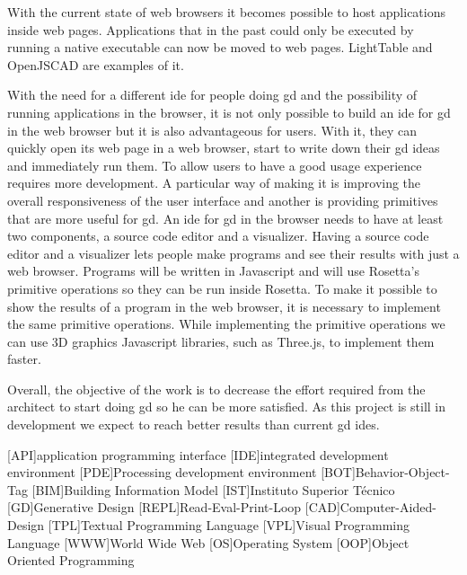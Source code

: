 \documentclass{./llncs2e/llncs}
\begin{document}
	With the current state of web browsers it becomes possible to host applications inside web pages. 
	Applications that in the past could only be executed by running a native executable can now be moved to web pages.
	LightTable and OpenJSCAD are examples of it.
	
	With the need for a different \ac{ide} for people doing \ac{gd} and the possibility of running applications in the browser, it is not only possible to build an \ac{ide} for \ac{gd} in the web browser but it is also advantageous for users.
	With it, they can quickly open its web page in a web browser, start to write down their \ac{gd} ideas and immediately run them.
	To allow users to have a good usage experience requires more development.
	A particular way of making it is improving the overall responsiveness of the user interface and another is providing primitives that are more useful for \ac{gd}.
	An \ac{ide} for \ac{gd} in the browser needs to have at least two components, a source code editor and a visualizer.
	Having a source code editor and a visualizer lets people make programs and see their results with just a web browser.
	Programs will be written in Javascript and will use Rosetta's primitive operations so they can be run inside Rosetta.
	To make it possible to show the results of a program in the web browser, it is necessary to implement the same primitive operations.
	While implementing the primitive operations we can use 3D graphics Javascript libraries, such as Three.js, to implement them faster.
	
	Overall, the objective of the work is to decrease the effort required from the architect to start doing \ac{gd} so he can be more satisfied.
	As this project is still in development we expect to reach better results than current \ac{gd} \acp{ide}.
	
	
\newpage

\begin{acronym}
	[API]{application programming interface}
	[IDE]{integrated development environment}
	[PDE]{Processing development environment}
	[BOT]{Behavior-Object-Tag}
	[BIM]{Building Information Model}
	[IST]{Instituto Superior Técnico}
	[GD]{Generative Design}
	[REPL]{Read-Eval-Print-Loop}
	[CAD]{Computer-Aided-Design}
	[TPL]{Textual Programming Language}
	[VPL]{Visual Programming Language}
	[WWW]{World Wide Web}
	[OS]{Operating System}
	[OOP]{Object Oriented Programming}
\end{acronym}

% 
% 
 

 
\end{document}
